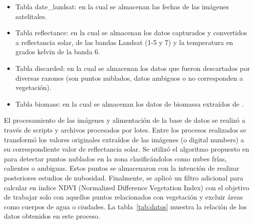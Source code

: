 \begin{itemize}
 \item Tabla date\_landsat: en la cual se almacenan las fechas de las imágenes satelitales.
 \item Tabla reflectance: en la cual se almacenan los datos capturados y convertidos a reflectancia solar, de las bandas Landsat (1-5 y 7) y la temperatura en grados kelvin de la banda 6.
 \item Tabla discarded: en la cual se almacenan los datos que fueron descartados por diversas razones (son puntos nublados, datos ambiguos o no corresponden a vegetación).
 \item Tabla biomass: en la cual se almacenan los datos de biomassa extraídos de \cite{baccini2008afirst}.
\end{itemize}

El procesamiento de las imágenes y alimentación de la base de datos se realizó a través de scripts y archivos procesados por lotes.  Entre los procesos realizados se transformó los valores originales extraídos de las imágenes (o digital numbers) a su correspondiente valor de reflectancia solar.  Se utilizó el algoritmo propuesto en \cite{irish2000landsat} para detectar puntos nublados en la zona clasificándolos como nubes frías, calientes o ambiguas.  Estos puntos se almacenaron con la intención de realizar posteriores estudios de nubosidad.  Finalmente, se aplicó un filtro adicional para calcular en índice NDVI (Normalized Difference Vegetation Index) con el objetivo de trabajar solo con aquellos puntos relacionados con vegetación y excluir áreas como cuerpos de agua o ciudades.  La tabla~\ref{tab:datos} muestra la relación de los datos obtenidos en este proceso.

